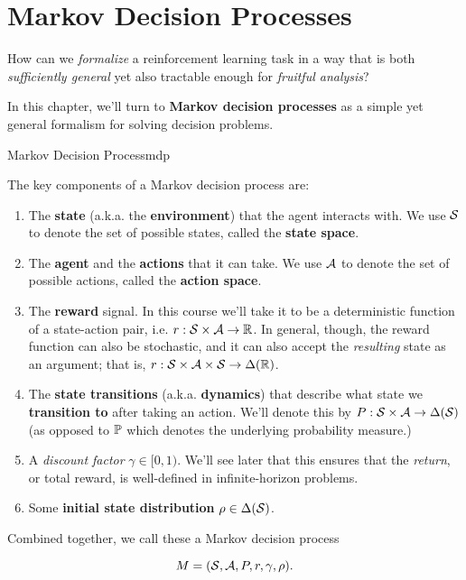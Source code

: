 \documentclass[../main/main]{subfiles}
\begin{document}
    
\chapter{Markov Decision Processes}

\tableofcontents



How can we \emph{formalize} a reinforcement learning task in a way that is both \emph{sufficiently general} yet also tractable enough for \emph{fruitful analysis}?

In this chapter, we'll turn to \textbf{Markov decision processes} as a simple yet general formalism for solving decision problems.

\begin{definition}{Markov Decision Process}{mdp}
    
The key components of a Markov decision process are:

\begin{enumerate}
    \item The \textbf{state} (a.k.a. the \textbf{environment}) that the agent interacts with. We use $\S$ to denote the set of possible states, called the \textbf{state space}.
    \item The \textbf{agent} and the \textbf{actions} that it can take. We use $\A$ to denote the set of possible actions, called the \textbf{action space}.
    \item The \textbf{reward} signal. In this course we'll take it to be a deterministic function of a state-action pair, i.e. $r : \S \times \A \to \mathbb{R}$. In general, though, the reward function can also be stochastic, and it can also accept the \emph{resulting} state as an argument; that is, $r : \S \times \A \times \S \to \Delta(\R)$.
    \item The \textbf{state transitions} (a.k.a. \textbf{dynamics}) that describe what state we \textbf{transition to} after taking an action. We'll denote this by $P : \S \times \A \to \Delta(\S)$ (as opposed to $\P$ which denotes the underlying probability measure.)
    \item A \emph{discount factor} $\gamma \in [0, 1)$. We'll see later that this ensures that the \emph{return}, or total reward, is well-defined in infinite-horizon problems.
    \item Some \textbf{initial state distribution} $\rho \in \Delta(\S)$.
\end{enumerate}

Combined together, we call these a Markov decision process

\[
    M = (\S, \A, P, r, \gamma, \rho).
\]

\end{definition}
\end{document}
